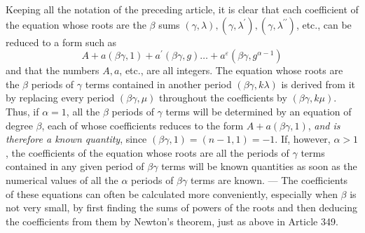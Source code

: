 Keeping all the notation of the preceding article, it is clear that each coefficient of the equation whose roots are the \(\beta\) sums \((\gamma,\lambda),\allowbreak (\gamma,\lambda^{\prime}),\allowbreak (\gamma,\lambda^{\prime\prime})\), etc., can be reduced to a form such as \[A+a(\beta\gamma,1)+a^{\prime}(\beta\gamma,g)\ldots+a^\varepsilon(\beta\gamma,g^{\alpha-1})\] and that the numbers \(A,\allowbreak a\), etc., are all integers. The equation whose roots are the \(\beta\) periods of \(\gamma\) terms contained in another period \((\beta\gamma,k\lambda)\) is derived from it by replacing every period \((\beta\gamma,\mu)\) throughout the coefficients by \((\beta\gamma,k\mu)\). Thus, if \(\alpha=1\), all the \(\beta\) periods of \(\gamma\) terms will be determined by an equation of degree \(\beta\), each of whose coefficients reduces to the form \(A+a(\beta\gamma,1)\), \textit{and is therefore a known quantity}, since \((\beta\gamma,1)=(n-1,1)=-1\). If, however, \(\alpha>1\), the coefficients of the equation whose roots are all the periods of \(\gamma\) terms contained in any given period of \(\beta\gamma\) terms will be known quantities as soon as the numerical values of all the \(\alpha\) periods of \(\beta\gamma\) terms are known. — The coefficients of these equations can often be calculated more conveniently, especially when \(\beta\) is not very small, by first finding the sums of powers of the roots and then deducing the coefficients from them by Newton's theorem, just as above in Article 349.

